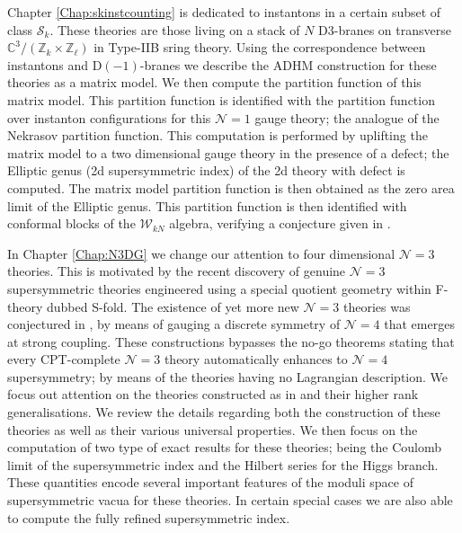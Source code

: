 \documentclass[main.tex]{subfiles}
\begin{document}
Chapter \ref{Chap:skinstcounting} is dedicated to instantons in a certain subset of class $\mathcal{S}_k$.  These theories are those living on a stack of $N$ D$3$-branes on transverse $\mathbb{C}^3/(\mathbb{Z}_k\times\mathbb{Z}_{\ell})$ in Type-IIB sring theory.  Using the correspondence between instantons and D$(-1)$-branes we describe the ADHM construction for these theories as a matrix model.  We then compute the partition function of this matrix model.  This partition function is identified with the partition function over instanton configurations for this $\mathcal{N}=1$ gauge theory; the analogue of the Nekrasov partition function.  This computation is performed by uplifting the matrix model to a two dimensional gauge theory in the presence of a defect; the Elliptic genus (2d supersymmetric index) of the 2d theory with defect is computed.  The matrix model partition function is then obtained as the zero area limit of the Elliptic genus.  This partition function is then identified with conformal blocks of the $\mathcal{W}_{kN}$ algebra, verifying a conjecture given in \cite{Mitev:2017jqj}.

In Chapter \ref{Chap:N3DG} we change our attention to four dimensional $\mathcal{N}=3$ theories.  This is motivated by the recent discovery \cite{Garcia-Etxebarria:2015wns} of genuine $\mathcal{N}=3$ supersymmetric theories engineered using a special quotient geometry within F-theory dubbed S-fold.  The existence of yet more new $\mathcal{N}=3$ theories was conjectured in \cite{Argyres:2016yzz}, by means of gauging a discrete symmetry of $\mathcal{N}=4$ that emerges at strong coupling.  These constructions bypasses the no-go theorems stating that every CPT-complete $\mathcal{N}=3$ theory automatically enhances to $\mathcal{N}=4$ supersymmetry; by means of the theories having no Lagrangian description.  We focus out attention on the theories constructed as in \cite{Argyres:2016yzz} and their higher rank generalisations.  We review the details regarding both the construction of these theories as well as their various universal properties.  We then focus on the computation of two type of exact results for these theories; being the Coulomb limit of the supersymmetric index and the Hilbert series for the Higgs branch.  These quantities encode several important features of the moduli space of supersymmetric vacua for these theories.  In certain special cases we are also able to compute the fully refined supersymmetric index.
\end{document}

